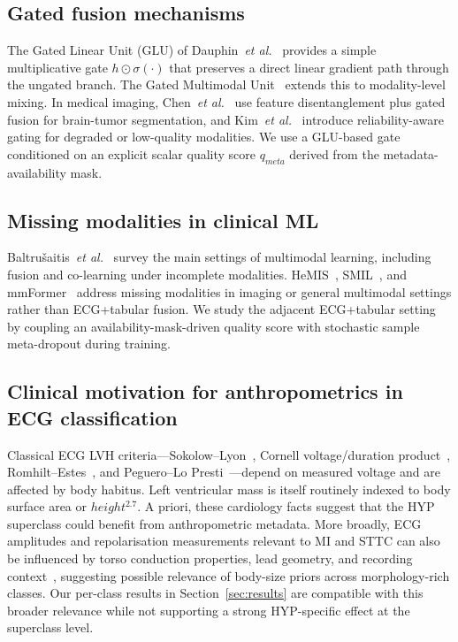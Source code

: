 \documentclass[mathematics,article,pdftex]{Definitions/mdpi}
\def\mathrm#1{#1}%
\def\mathbf#1{#1}%
\def\emph#1{#1}%
\begin{document}
\subsection{Gated fusion mechanisms}
The Gated Linear Unit (GLU) of Dauphin~\textit{et al.}~\cite{Dauphin2017} provides a simple multiplicative gate $\mathbf{h} \odot \sigma(\cdot)$ that preserves a direct linear gradient path through the ungated branch. The Gated Multimodal Unit~\cite{Arevalo2020} extends this to modality-level mixing. In medical imaging, Chen~\textit{et al.}~\cite{Chen2019MICCAI} use feature disentanglement plus gated fusion for brain-tumor segmentation, and Kim~\textit{et al.}~\cite{Kim2018ACCV} introduce reliability-aware gating for degraded or low-quality modalities. We use a GLU-based gate conditioned on an explicit scalar quality score $q_{\mathrm{meta}}$ derived from the metadata-availability mask.

\subsection{Missing modalities in clinical ML}
Baltru{\v{s}}aitis~\textit{et al.}~\cite{Baltrusaitis2019} survey the main settings of multimodal learning, including fusion and co-learning under incomplete modalities. HeMIS~\cite{Havaei2016}, SMIL~\cite{Ma2021}, and mmFormer~\cite{Zhang2022} address missing modalities in imaging or general multimodal settings rather than ECG+tabular fusion. We study the adjacent ECG+tabular setting by coupling an availability-mask-driven quality score with stochastic sample meta-dropout during training.

\subsection{Clinical motivation for anthropometrics in ECG classification}
Classical ECG LVH criteria---Sokolow--Lyon~\cite{Sokolow1949}, Cornell voltage/duration product~\cite{Casale1985}, Romhilt--Estes~\cite{Romhilt1968}, and Peguero--Lo Presti~\cite{Peguero2017}---depend on measured voltage and are affected by body habitus. Left ventricular mass is itself routinely indexed to body surface area or $\mathrm{height}^{2.7}$. \emph{A priori}, these cardiology facts suggest that the HYP superclass could benefit from anthropometric metadata. More broadly, ECG amplitudes and repolarisation measurements relevant to MI and STTC can also be influenced by torso conduction properties, lead geometry, and recording context~\cite{Rautaharju2009, MacFarlane2011}, suggesting possible relevance of body-size priors across morphology-rich classes. Our per-class results in Section~\ref{sec:results} are compatible with this broader relevance while not supporting a strong HYP-specific effect at the superclass level.
\end{document}
